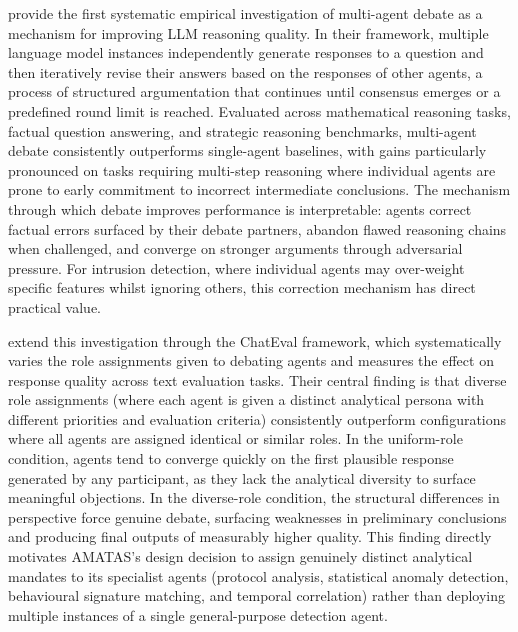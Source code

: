 \textcite{Du2023} provide the first systematic empirical investigation of multi-agent debate as a mechanism for improving LLM reasoning quality. In their framework, multiple language model instances independently generate responses to a question and then iteratively revise their answers based on the responses of other agents, a process of structured argumentation that continues until consensus emerges or a predefined round limit is reached. Evaluated across mathematical reasoning tasks, factual question answering, and strategic reasoning benchmarks, multi-agent debate consistently outperforms single-agent baselines, with gains particularly pronounced on tasks requiring multi-step reasoning where individual agents are prone to early commitment to incorrect intermediate conclusions. The mechanism through which debate improves performance is interpretable: agents correct factual errors surfaced by their debate partners, abandon flawed reasoning chains when challenged, and converge on stronger arguments through adversarial pressure. For intrusion detection, where individual agents may over-weight specific features whilst ignoring others, this correction mechanism has direct practical value.

\textcite{Chan2023} extend this investigation through the ChatEval framework, which systematically varies the role assignments given to debating agents and measures the effect on response quality across text evaluation tasks. Their central finding is that diverse role assignments (where each agent is given a distinct analytical persona with different priorities and evaluation criteria) consistently outperform configurations where all agents are assigned identical or similar roles. In the uniform-role condition, agents tend to converge quickly on the first plausible response generated by any participant, as they lack the analytical diversity to surface meaningful objections. In the diverse-role condition, the structural differences in perspective force genuine debate, surfacing weaknesses in preliminary conclusions and producing final outputs of measurably higher quality. This finding directly motivates AMATAS's design decision to assign genuinely distinct analytical mandates to its specialist agents (protocol analysis, statistical anomaly detection, behavioural signature matching, and temporal correlation) rather than deploying multiple instances of a single general-purpose detection agent.

